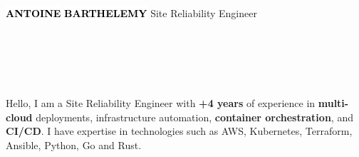 \documentclass[10pt]{developercv}
\begin{document}
\begin{minipage}[t]{0.50\textwidth}
	\vspace{-\baselineskip}
	\vspace{10pt}
	\colorbox{white}{{\HUGE\textcolor{black}{\textbf{\MakeUppercase{Antoine}}}}}
	\colorbox{white}{{\HUGE\textcolor{black}{\textbf{\MakeUppercase{Barthelemy}}}}}
	\vspace{6pt}
	{\huge Site Reliability Engineer}
\end{minipage}
\begin{minipage}[t]{0.28\textwidth}
	\vspace{-\baselineskip}
	\vspace{9pt}
	\\
	\\
	\\
	\\
\end{minipage}
\begin{minipage}[t]{0.275\textwidth}
	\vspace{-\baselineskip}
	\hspace{0.1cm}
\end{minipage}

\vspace{0.5cm}


\hspace{0pt}\begin{minipage}[t]{1.00\textwidth}
	\vspace{-\baselineskip}
	{Hello, I am a Site Reliability Engineer with \textbf{+4 years} of experience in \textbf{multi-cloud} deployments, infrastructure automation, \textbf{container orchestration}, and \textbf{CI/CD}. I have expertise in technologies such as AWS, Kubernetes, Terraform, Ansible, Python, Go and Rust.} %
\end{minipage}
\hfill

\end{document}
